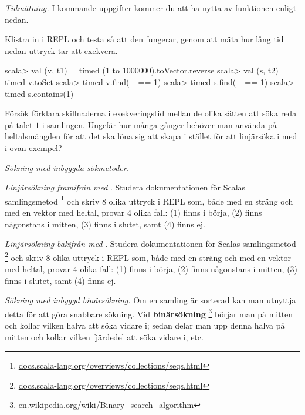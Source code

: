 \Task \label{task:timed}\emph{Tidmätning.} I kommande uppgifter kommer du att ha nytta av funktionen  enligt nedan. 
\Subtask Klistra in  i REPL och testa så att den fungerar, genom att mäta hur lång tid nedan uttryck tar att exekvera. 
\begin{REPL}
scala> val (v, t1) = timed{ (1 to 1000000).toVector.reverse }
scala> val (s, t2) = timed{ v.toSet } 
scala> timed{ v.find(_ == 1) } 
scala> timed{ s.find(_ == 1) } 
scala> timed{ s.contains(1) } 
\end{REPL} 
\Subtask\Pen Försök förklara skillnaderna i exekveringstid mellan de olika sätten att söka reda på  talet $1$ i samlingen. Ungefär hur många gånger behöver man använda  på heltalsmängden  för att det ska löna sig att skapa  i stället för att linjärsöka i  med  i ovan exempel?


\Task \emph{Sökning med inbyggda sökmetoder.} 

\Subtask \emph{Linjärsökning framifrån med }. Studera dokumentationen för Scalas samlingsmetod \footnote{\href{http://docs.scala-lang.org/overviews/collections/seqs.html}{docs.scala-lang.org/overviews/collections/seqs.html}} och skriv 8 olika uttryck i REPL som, både med en sträng och med en vektor med heltal, provar 4 olika fall: (1) finns i börja, (2) finns någonstans i mitten, (3) finns i slutet, samt (4) finns ej.

\Subtask \emph{Linjärsökning bakifrån med }. Studera dokumentationen för Scalas samlingsmetod \footnote{\href{http://docs.scala-lang.org/overviews/collections/seqs.html}{docs.scala-lang.org/overviews/collections/seqs.html}} och skriv 8 olika uttryck i REPL som, både med en sträng och med en vektor med heltal, provar 4 olika fall: (1) finns i börja, (2) finns någonstans i mitten, (3) finns i slutet, samt (4) finns ej.

\Subtask \emph{Sökning med inbyggd binärsökning.} Om en samling är sorterad kan man utnyttja detta för att göra snabbare sökning. Vid \textbf{binärsökning} \footnote{\href{https://en.wikipedia.org/wiki/Binary_search_algorithm}{en.wikipedia.org/wiki/Binary\_search\_algorithm}} börjar man på mitten och kollar vilken halva att  söka vidare i; sedan delar man upp denna halva på mitten och kollar vilken fjärdedel att söka vidare i, etc. 

